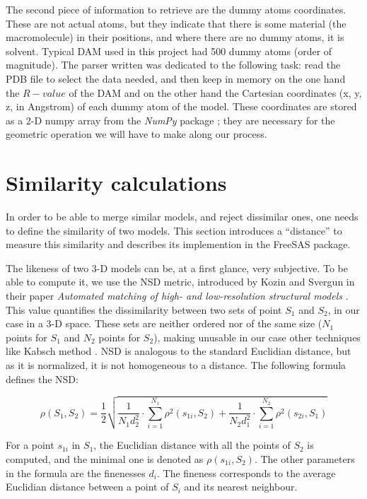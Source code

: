 \documentclass[a4paper, 11pt]{report}
\begin{document}
The second piece of information to retrieve are the dummy atoms 
coordinates. 
These are not actual atoms, but they indicate that there is some 
material (the macromolecule) in their positions, and where there are 
no dummy atoms, it is solvent. 
Typical DAM used in this project had 500 dummy atoms (order of 
magnitude). 
The parser written was dedicated to the following task: read the PDB 
file to select the data needed, and then keep in memory on the one 
hand the $R-value$ of the DAM and on the other hand the Cartesian 
coordinates (x, y, z, in Angstrom) of each dummy atom of the model. 
These coordinates are stored as a 2-D numpy array from the 
\textit{NumPy} package \cite{numpy}; they are necessary for the 
geometric operation we will have to make along our process.

\section{Similarity calculations}

In order to be able to merge similar models, and reject dissimilar 
ones, one needs to define the similarity of two models. 
This section introduces a ``distance'' to measure this  
similarity and describes its implemention in the FreeSAS
package.

The likeness of two 3-D models can be, at a first glance, very 
subjective. 
To be able to compute it, we use the NSD metric, introduced by Kozin 
and Svergun in their paper \textit{Automated matching of high- and 
low-resolution structural models} \cite{supcomb}. 
This value quantifies the dissimilarity between two sets of 
point $S_{1}$ and $S_{2}$, in our case in a 3-D space.
These sets are neither ordered nor of the same size ($N_{1}$ points 
for $S_{1}$ and $N_{2}$ points for $S_{2}$), making unusable in our 
case other techniques like Kabsch method \cite{kabsch1976}.
NSD is analogous to the standard Euclidian distance, but as it is 
normalized, it is not homogeneous to a distance. 
The following formula defines the NSD:

\[
\rho(S_{1},S_{2})= \frac{1}{2} \sqrt {\frac{1}{N_{1}d_{2}^2} 
\cdot \sum\limits_{i=1}^{N_{1}} \rho^2(s_{1i}, S_{2}) + \frac{1}{N_{2}d_{1}^2} \cdot \sum\limits_{i=1}^{N_{2}} \rho^2(s_{2i}, S_{1})}
\]

For a point $s_{1i}$ in $S_{1}$, the Euclidian distance with all the 
points of $S_{2}$ is computed, and the minimal one is denoted as 
$\rho(s_{1i}, S_{2})$. 
The other parameters in the formula are the finenesses $d_{i}$. 
The fineness corresponds to the average Euclidian distance between a 
point of $S_{i}$ and its nearest neighbour.
\end{document}
